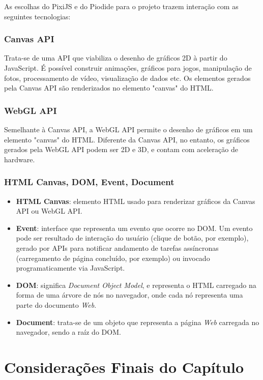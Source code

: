 \begin{apendicesenv}
As escolhas do PixiJS e do Piodide para o projeto trazem interação com as seguintes tecnologias:

\subsubsection{Canvas API}
Trata-se de uma API que viabiliza o desenho de gráficos 2D à partir do JavaScript. É possível construir animações, gráficos para jogos, manipulação de fotos, processamento de vídeo, visualização de dados etc. Os elementos gerados pela Canvas API são renderizados no elemento "canvas" do HTML.

\subsubsection{WebGL API}

Semelhante à Canvas API, a WebGL API permite o desenho de gráficos em um elemento "canvas" do HTML.
Diferente da Canvas API, no entanto, os gráficos gerados pela WebGL API podem ser 2D e 3D, e contam
com aceleração de hardware.

\subsubsection{HTML Canvas, DOM, Event, Document}

\begin{itemize}

	\item \textbf{HTML Canvas}: elemento HTML usado para renderizar gráficos da Canvas API ou WebGL API.
	\item  \textbf{Event}: interface que representa um evento que ocorre no DOM. Um evento pode ser resultado
	de interação do usuário (clique de botão, por exemplo), gerado por APIs para notificar andamento
	de tarefas assíncronas (carregamento de página concluído, por exemplo) ou invocado programaticamente
	via JavaScript.
	\item  \textbf{DOM}: significa \textit{Document Object Model}, e representa o HTML carregado na
	forma de uma árvore de nós no navegador, onde cada nó representa uma parte do documento \textit{Web}.
	\item \textbf{Document}: trata-se de um objeto que representa a página \textit{Web} carregada no
	navegador, sendo a raíz do DOM.

\end{itemize}

\section{Considerações Finais do Capítulo}


\end{apendicesenv}
